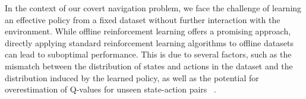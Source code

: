 



In the context of our covert navigation problem, we face the challenge of learning an effective policy from a fixed dataset without further interaction with the environment. While offline reinforcement learning offers a promising approach, directly applying standard reinforcement learning algorithms to offline datasets can lead to suboptimal performance. This is due to several factors, such as the mismatch between the distribution of states and actions in the dataset and the distribution induced by the learned policy, as well as the potential for overestimation of Q-values for unseen state-action pairs ~\cite{prudencio2023survey}.

